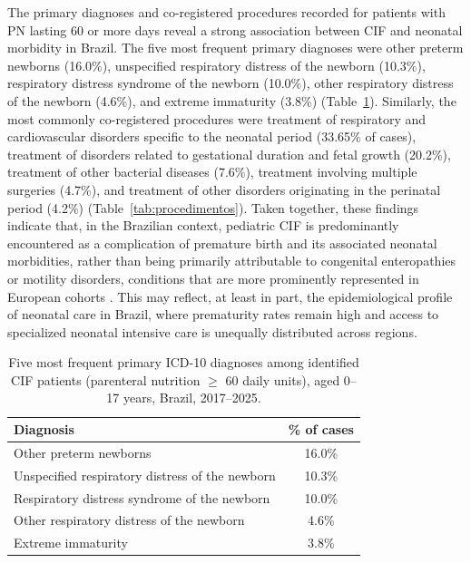 \documentclass[12pt,a4paper]{article}
\theoremstyle{plain}
\theoremstyle{definition}
\theoremstyle{remark}
\begin{document}
The primary diagnoses and co-registered procedures recorded for patients with PN lasting 60 or more days reveal a strong association between CIF and neonatal morbidity in Brazil. The five most frequent primary diagnoses were other preterm newborns (16.0\%), unspecified respiratory distress of the newborn (10.3\%), respiratory distress syndrome of the newborn (10.0\%), other respiratory distress of the newborn (4.6\%), and extreme immaturity (3.8\%) (Table~\ref{tab:diagnosticos}). Similarly, the most commonly co-registered procedures were treatment of respiratory and cardiovascular disorders specific to the neonatal period (33.65\% of cases), treatment of disorders related to gestational duration and fetal growth (20.2\%), treatment of other bacterial diseases (7.6\%), treatment involving multiple surgeries (4.7\%), and treatment of other disorders originating in the perinatal period (4.2\%) (Table~\ref{tab:procedimentos}). Taken together, these findings indicate that, in the Brazilian context, pediatric CIF is predominantly encountered as a complication of premature birth and its associated neonatal morbidities, rather than being primarily attributable to congenital enteropathies or motility disorders, conditions that are more prominently represented in European cohorts \cite{beath2011trends, antunes2020portuguese}. This may reflect, at least in part, the epidemiological profile of neonatal care in Brazil, where prematurity rates remain high and access to specialized neonatal intensive care is unequally distributed across regions.

\begin{table}[ht]
\centering
\caption{Five most frequent primary ICD-10 diagnoses among identified CIF patients (parenteral nutrition $\geq$ 60 daily units), aged 0--17 years, Brazil, 2017--2025.}
\label{tab:diagnosticos}
\renewcommand{\arraystretch}{1.3}
\begin{tabular}{lc}
\toprule
Diagnosis & \% of cases \\
\midrule
Other preterm newborns & 16.0\% \\
Unspecified respiratory distress of the newborn & 10.3\% \\
Respiratory distress syndrome of the newborn & 10.0\% \\
Other respiratory distress of the newborn & 4.6\% \\
Extreme immaturity & 3.8\% \\
\bottomrule
\end{tabular}
\end{table}
\end{document}
